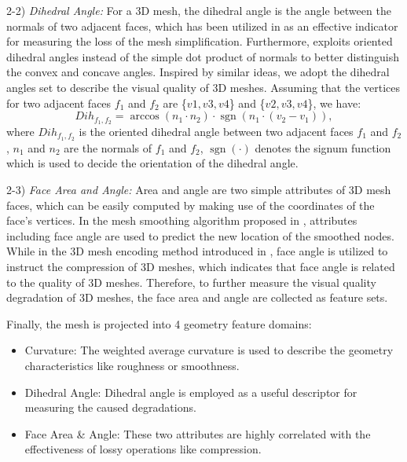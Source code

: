 \documentclass[lettersize,journal]{IEEEtran}
\begin{document}
2-2) \textit{Dihedral Angle:}
For a 3D mesh, the dihedral angle is the angle between the normals of two adjacent faces, which has been utilized in \cite{dihedral2} as an effective indicator for measuring the loss of the mesh simplification. Furthermore, \cite{dame} exploits oriented dihedral angles instead of the simple dot product of normals to better distinguish the convex and concave angles. Inspired by similar ideas, we adopt the dihedral angles set to describe the visual quality of 3D meshes. Assuming that the vertices for two adjacent faces $f_{1}$ and $f_{2}$ are \{$v1,v3,v4$\} and \{$v2,v3,v4$\}, we have:
\begin{equation}
Dih_{f_{1}, f_{2}}=\arccos \left(n_{1} \cdot n_{2}\right) \cdot \operatorname{sgn}\left(n_{1} \cdot\left(v_{2}-v_{1}\right)\right),
\end{equation}
where $Dih_{f_{1}, f_{2}}$ is the oriented dihedral angle between two adjacent faces $f_{1}$ and $f_{2}$, $n_{1}$ and $n_{2}$ are the normals of $f_{1}$ and $f_{2}$, $\operatorname{sgn}(\cdot)$ denotes the signum function which is used to decide the orientation of the dihedral angle. 

2-3) \textit{Face Area and Angle:}
Area and angle are two simple attributes of 3D mesh faces, which can be easily computed by making use of the coordinates of the face's vertices. In the mesh smoothing algorithm proposed in \cite{angle1}, attributes including face angle are used to predict the new location of the smoothed nodes. While in the 3D mesh encoding method introduced in \cite{angle2}, face angle is utilized to instruct the compression of 3D meshes, which indicates that face angle is related to the quality of 3D meshes. Therefore, to further measure the visual quality degradation of 3D meshes, the face area and angle are collected as feature sets. 

Finally, the mesh is projected into 4 geometry feature domains:
\begin{itemize}
    \item Curvature: The weighted average curvature is used to describe the geometry characteristics like roughness or smoothness.
    \item Dihedral Angle: Dihedral angle is employed as a useful descriptor for measuring the caused degradations.
    \item Face Area \& Angle: These two attributes are highly correlated with the effectiveness of lossy operations like compression.
\end{itemize}
\end{document}
